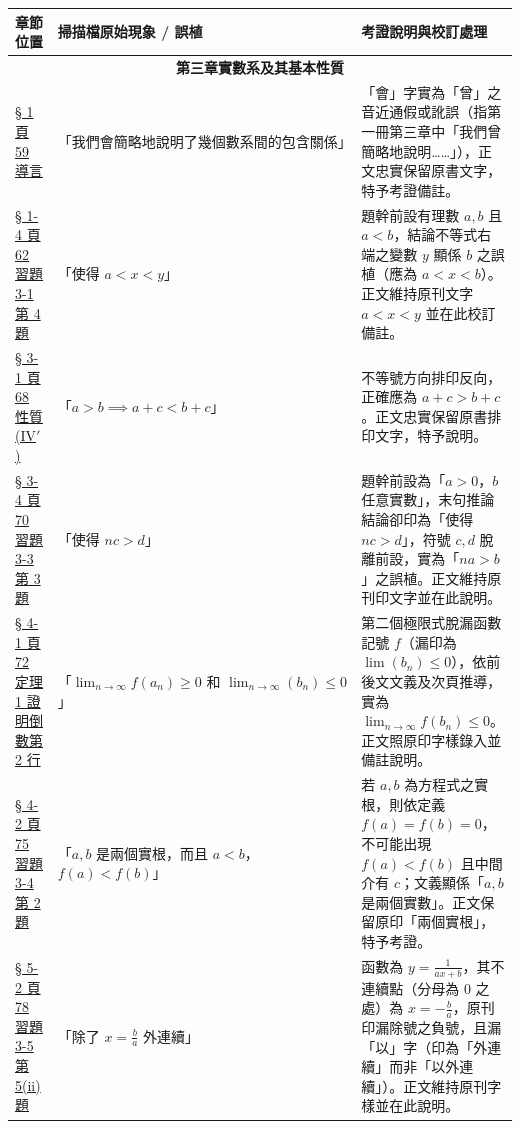 \documentclass[a4paper,12pt,twoside]{article}
\begin{document}
\begin{table}[H]
\centering
\small
\renewcommand{\arraystretch}{1.35}
\begin{tabularx}{\textwidth}{|p{3.0cm}|p{3.8cm}|X|}
\hline
\textbf{章節位置} & \textbf{掃描檔原始現象 / 誤植} & \textbf{考證說明與校訂處理} \\ \hline

\multicolumn{3}{|c|}{\textbf{第三章\quad 實數系及其基本性質}} \\ \hline

\hyperref[note:b2-ch3-ceng]{§ 1 頁 59 導言} & 
「我們會簡略地說明了幾個數系間的包含關係」 & 
「會」字實為「曾」之音近通假或訛誤（指第一冊第三章中「我們曾簡略地說明……」），正文忠實保留原書文字，特予考證備註。 \\ \hline

\hyperref[note:b2-ch3-ex3-1-q4-xy]{§ 1-4 頁 62 習題 3-1 第 4 題} & 
「使得 $a < x < y$」 & 
題幹前設有理數 $a, b$ 且 $a < b$，結論不等式右端之變數 $y$ 顯係 $b$ 之誤植（應為 $a < x < b$）。正文維持原刊文字 $a < x < y$ 並在此校訂備註。 \\ \hline

\hyperref[note:b2-ch3-prop-iv-prime]{§ 3-1 頁 68 性質 (IV$'$)} & 
「$a > b \implies a+c < b+c$」 & 
不等號方向排印反向，正確應為 $a+c > b+c$。正文忠實保留原書排印文字，特予說明。 \\ \hline

\hyperref[note:b2-ch3-ex3-3-q3-nc-d]{§ 3-4 頁 70 習題 3-3 第 3 題} & 
「使得 $nc > d$」 & 
題幹前設為「$a > 0$，$b$ 任意實數」，末句推論結論卻印為「使得 $nc > d$」，符號 $c, d$ 脫離前設，實為「$na > b$」之誤植。正文維持原刊印文字並在此說明。 \\ \hline

\hyperref[note:b2-ch3-lim-bn]{§ 4-1 頁 72 定理 1 證明倒數第 2 行} & 
「$\lim_{n\to\infty} f(a_n) \ge 0 \text{ 和 } \lim_{n\to\infty} (b_n) \le 0$」 & 
第二個極限式脫漏函數記號 $f$（漏印為 $\lim (b_n) \le 0$），依前後文文義及次頁推導，實為 $\lim_{n\to\infty} f(b_n) \le 0$。正文照原印字樣錄入並備註說明。 \\ \hline

\hyperref[note:b2-ch3-ex3-4-q2-roots]{§ 4-2 頁 75 習題 3-4 第 2 題} & 
「$a, b$ 是兩個實根，而且 $a < b$，$f(a) < f(b)$」 & 
若 $a, b$ 為方程式之實根，則依定義 $f(a) = f(b) = 0$，不可能出現 $f(a) < f(b)$ 且中間介有 $c$；文義顯係「$a, b$ 是兩個實數」。正文保留原印「兩個實根」，特予考證。 \\ \hline

\hyperref[note:b2-ch3-ex3-5-q5-sign]{§ 5-2 頁 78 習題 3-5 第 5(ii) 題} & 
「除了 $x = \frac{b}{a}$ 外連續」 & 
函數為 $y = \frac{1}{ax+b}$，其不連續點（分母為 0 之處）為 $x = -\frac{b}{a}$，原刊印漏除號之負號，且漏「以」字（印為「外連續」而非「以外連續」）。正文維持原刊字樣並在此說明。 \\ \hline

\end{tabularx}
\end{table}
\end{document}
